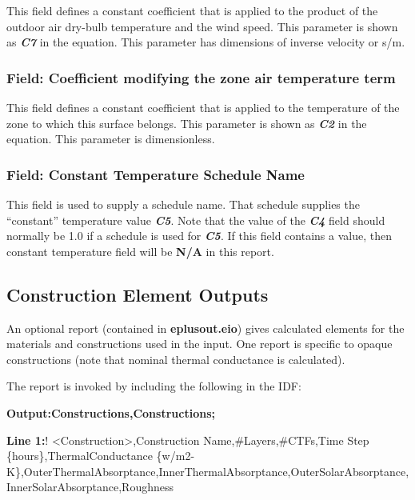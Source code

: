 This field defines a constant coefficient that is applied to the product of the outdoor air dry-bulb temperature and the wind speed. This parameter is shown as \textbf{\emph{C7}} in the equation. This parameter has dimensions of inverse velocity or s/m.

\subsubsection{Field: Coefficient modifying the zone air temperature term}\label{field-coefficient-modifying-the-zone-air-temperature-term}

This field defines a constant coefficient that is applied to the temperature of the zone to which this surface belongs. This parameter is shown as \textbf{\emph{C2}} in the equation. This parameter is dimensionless.

\subsubsection{Field: Constant Temperature Schedule Name}\label{field-constant-temperature-schedule-name}

This field is used to supply a schedule name. That schedule supplies the ``constant'' temperature value \textbf{\emph{C5}}. Note that the value of the \textbf{\emph{C4}} field should normally be 1.0 if a schedule is used for \textbf{\emph{C5}}. If this field contains a value, then constant temperature field will be \textbf{N/A} in this report.

\subsection{Construction Element Outputs}\label{construction-element-outputs}

An optional report (contained in \textbf{eplusout.eio}) gives calculated elements for the materials and constructions used in the input. One report is specific to opaque constructions (note that nominal thermal conductance is calculated).

The report is invoked by including the following in the IDF:

\textbf{Output:Constructions,Constructions;}

\textbf{Line 1:}! \textless{}Construction\textgreater{},Construction Name,\#Layers,\#CTFs,Time Step \{hours\},ThermalConductance \{w/m2-K\},OuterThermalAbsorptance,InnerThermalAbsorptance,OuterSolarAbsorptance,InnerSolarAbsorptance,Roughness

